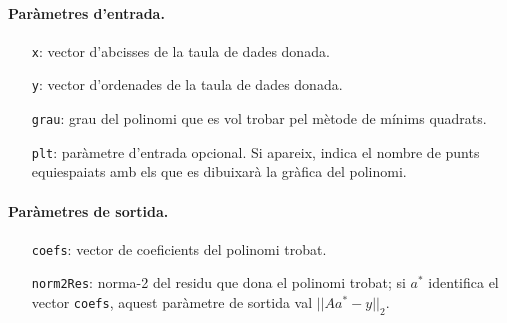 \documentclass[11pt]{article}
\newcommand{\norm}[1]{||#1||_2}
\begin{document}
\paragraph{Paràmetres d'entrada.}
\begin{itemize}
    \item[\texttt{x}:] vector d'abcisses de la taula de dades donada.
    \item[\texttt{y}:] vector d'ordenades de la taula de dades donada.
    \item[\texttt{grau}:] grau del polinomi que es vol trobar pel mètode de mínims quadrats.
    \item[\texttt{plt}:] paràmetre d'entrada opcional. Si apareix, indica el nombre de punts equiespaiats amb els que es dibuixarà la gràfica del polinomi.
\end{itemize}
\paragraph{Paràmetres de sortida.}
\begin{itemize}
    \item[\texttt{coefs}:] vector de coeficients del polinomi trobat.
    \item[\texttt{norm2Res}:] norma-2 del residu que dona el polinomi trobat; si $a^*$ identifica el vector \texttt{coefs}, aquest paràmetre de sortida val $\norm{Aa^*-y}$.
\end{itemize}
\end{document}
